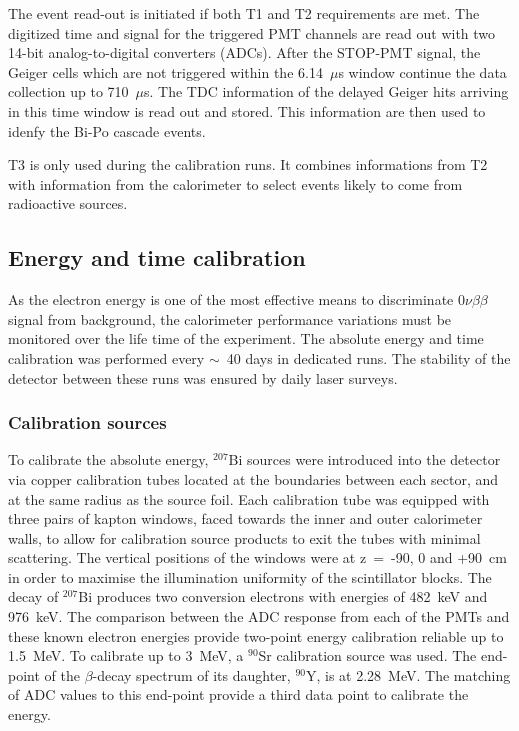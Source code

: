 \documentclass[main.tex]{subfiles}
\begin{document}
\bigskip


\NI The event read-out is initiated if both T1 and T2 requirements are met. The digitized time and signal for the triggered PMT channels are read out with two 14-bit analog-to-digital converters (ADCs). After the STOP-PMT signal, the Geiger cells which are not triggered within the 6.14~$\mu$s window continue the data collection up to 710~$\mu$s. The TDC information of the delayed Geiger hits arriving in this time window is read out and stored. This information are then used to idenfy the Bi-Po cascade events.


\bigskip


\NI T3 is only used during the calibration runs. It combines informations from T2 with information from the calorimeter to select events likely to come from radioactive sources.




\subsection{Energy and time calibration}\label{sec:EnergyTimeCalibration}


\NI As the electron energy is one of the most effective means to discriminate 0$\nu\beta\beta$ signal from background, the calorimeter performance variations must be monitored over the life time of the experiment. The absolute energy and time calibration was performed every $\sim$~40 days in dedicated runs. The stability of the detector between these runs was ensured by daily laser surveys.
  

\subsubsection{Calibration sources}


\NI To calibrate the absolute energy, $^{\text{207}}$Bi sources were introduced into the detector via copper calibration tubes located at the boundaries between each sector, and at the same radius as the source foil. Each calibration tube was equipped with three pairs of kapton windows, faced towards the inner and outer calorimeter walls, to allow for calibration source products to exit the tubes with minimal scattering. The vertical positions of the windows were at z~=~-90, 0 and +90~cm in order to maximise the illumination uniformity of the scintillator blocks. The decay of $^{\text{207}}$Bi produces two conversion electrons with energies of 482~keV and 976~keV. The comparison between the ADC response from each of the PMTs and these known electron energies provide two-point energy calibration reliable up to 1.5~MeV. To calibrate up to 3~MeV, a $^{\text{90}}$Sr calibration source was used. The end-point of the $\beta$-decay spectrum of its daughter, $^{\text{90}}$Y, is at 2.28~MeV. The matching of ADC values to this end-point provide a third data point to calibrate the energy.
\end{document}

